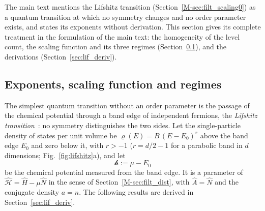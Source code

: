 \documentclass[10pt,a4paper]{article}
\theoremstyle{plain}
\theoremstyle{remark}
\newcommand{\hfield}{\mathscr{h}}  %
\begin{document}
The main text mentions the Lifshitz transition (Section~\ref{M-sec:filt_scaling0})
as a quantum transition at which no symmetry changes and no order parameter
exists, and states its exponents without derivation. This section gives
its complete treatment in the formulation of the main text: the
homogeneity of the level count, the scaling function and its three regimes
(Section~\ref{sec:lif_results}), and the derivations
(Section~\ref{sec:lif_deriv}).

\subsection{Exponents, scaling function and regimes}
\label{sec:lif_results}

The simplest quantum transition without an order parameter is the passage
of the chemical potential through a band edge of independent fermions, the
\emph{Lifshitz transition}~\cite{Lifshitz1960}: no symmetry distinguishes
the two sides. Let the single-particle density of states per unit volume
be $\varrho(E)=B\,(E-E_0)^{r}$ above the band edge $E_0$ and zero below it,
with $r>-1$ ($r=d/2-1$ for a parabolic band in $d$ dimensions;
Fig.~\ref{fig:lifshitz}a), and let
\[
  \hfield:=\mu-E_0
\]
be the chemical potential measured from the band edge. It is a parameter of
$\hat{\mathcal H}=\hat H-\mu\hat N$ in the sense of
Section~\ref{M-sec:filt_dist}, with $\hat A=\hat N$ and the conjugate density
$a=n$. The following results are derived in Section~\ref{sec:lif_deriv}.
\end{document}
